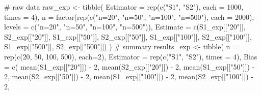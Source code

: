 \documentclass[
]{article}
\newenvironment{Shaded}{\begin{snugshade}}{\end{snugshade}}
\newcommand{\AttributeTok}[1]{\textcolor[rgb]{0.40,0.45,0.13}{#1}}
\newcommand{\CommentTok}[1]{\textcolor[rgb]{0.37,0.37,0.37}{#1}}
\newcommand{\DecValTok}[1]{\textcolor[rgb]{0.68,0.00,0.00}{#1}}
\newcommand{\FunctionTok}[1]{\textcolor[rgb]{0.28,0.35,0.67}{#1}}
\newcommand{\NormalTok}[1]{\textcolor[rgb]{0.00,0.23,0.31}{#1}}
\newcommand{\OtherTok}[1]{\textcolor[rgb]{0.00,0.23,0.31}{#1}}
\newcommand{\SpecialCharTok}[1]{\textcolor[rgb]{0.37,0.37,0.37}{#1}}
\newcommand{\StringTok}[1]{\textcolor[rgb]{0.13,0.47,0.30}{#1}}
\begin{document}
\begin{Shaded}
\begin{Highlighting}[numbers=left,,]
\CommentTok{\# raw data }
\NormalTok{raw\_exp }\OtherTok{\textless{}{-}} \FunctionTok{tibble}\NormalTok{(}
  \AttributeTok{Estimator =} \FunctionTok{rep}\NormalTok{(}\FunctionTok{c}\NormalTok{(}\StringTok{"S1"}\NormalTok{, }\StringTok{"S2"}\NormalTok{), }\AttributeTok{each =} \DecValTok{1000}\NormalTok{, }\AttributeTok{times =} \DecValTok{4}\NormalTok{),}
  \AttributeTok{n =} \FunctionTok{factor}\NormalTok{(}\FunctionTok{rep}\NormalTok{(}\FunctionTok{c}\NormalTok{(}\StringTok{"n=20"}\NormalTok{, }\StringTok{"n=50"}\NormalTok{, }\StringTok{"n=100"}\NormalTok{, }\StringTok{"n=500"}\NormalTok{), }\AttributeTok{each =} \DecValTok{2000}\NormalTok{),}
            \AttributeTok{levels =} \FunctionTok{c}\NormalTok{(}\StringTok{"n=20"}\NormalTok{, }\StringTok{"n=50"}\NormalTok{, }\StringTok{"n=100"}\NormalTok{, }\StringTok{"n=500"}\NormalTok{)),}
  \AttributeTok{Estimate =} \FunctionTok{c}\NormalTok{(S1\_exp[[}\StringTok{"20"}\NormalTok{]], S2\_exp[[}\StringTok{"20"}\NormalTok{]],}
\NormalTok{              S1\_exp[[}\StringTok{"50"}\NormalTok{]], S2\_exp[[}\StringTok{"50"}\NormalTok{]],}
\NormalTok{              S1\_exp[[}\StringTok{"100"}\NormalTok{]], S2\_exp[[}\StringTok{"100"}\NormalTok{]],}
\NormalTok{              S1\_exp[[}\StringTok{"500"}\NormalTok{]], S2\_exp[[}\StringTok{"500"}\NormalTok{]])}
\NormalTok{)}
\CommentTok{\# summary }
\NormalTok{results\_exp }\OtherTok{\textless{}{-}} \FunctionTok{tibble}\NormalTok{(}
  \AttributeTok{n =} \FunctionTok{rep}\NormalTok{(}\FunctionTok{c}\NormalTok{(}\DecValTok{20}\NormalTok{, }\DecValTok{50}\NormalTok{, }\DecValTok{100}\NormalTok{, }\DecValTok{500}\NormalTok{), }\AttributeTok{each=}\DecValTok{2}\NormalTok{),}
  \AttributeTok{Estimator =} \FunctionTok{rep}\NormalTok{(}\FunctionTok{c}\NormalTok{(}\StringTok{"S1"}\NormalTok{, }\StringTok{"S2"}\NormalTok{), }\AttributeTok{times =} \DecValTok{4}\NormalTok{),}
  \AttributeTok{Bias =} \FunctionTok{c}\NormalTok{(}
    \FunctionTok{mean}\NormalTok{(S1\_exp[[}\StringTok{"20"}\NormalTok{]]) }\SpecialCharTok{{-}} \DecValTok{2}\NormalTok{, }\FunctionTok{mean}\NormalTok{(S2\_exp[[}\StringTok{"20"}\NormalTok{]]) }\SpecialCharTok{{-}} \DecValTok{2}\NormalTok{,}
    \FunctionTok{mean}\NormalTok{(S1\_exp[[}\StringTok{"50"}\NormalTok{]]) }\SpecialCharTok{{-}} \DecValTok{2}\NormalTok{, }\FunctionTok{mean}\NormalTok{(S2\_exp[[}\StringTok{"50"}\NormalTok{]]) }\SpecialCharTok{{-}} \DecValTok{2}\NormalTok{,}
    \FunctionTok{mean}\NormalTok{(S1\_exp[[}\StringTok{"100"}\NormalTok{]]) }\SpecialCharTok{{-}} \DecValTok{2}\NormalTok{, }\FunctionTok{mean}\NormalTok{(S2\_exp[[}\StringTok{"100"}\NormalTok{]]) }\SpecialCharTok{{-}} \DecValTok{2}\NormalTok{,}

\end{Highlighting}
\end{Shaded}
\end{document}
